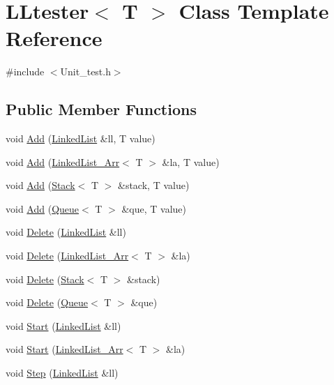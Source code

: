\hypertarget{class_l_ltester}{\section{L\-Ltester$<$ T $>$ Class Template Reference}
\label{class_l_ltester}
}


{\ttfamily \#include $<$Unit\-\_\-test.\-h$>$}

\subsection*{Public Member Functions}
\begin{DoxyCompactItemize}
\item 
void \hyperlink{class_l_ltester_af16564815500d55d820f996b9bfd73e4}{Add} (\hyperlink{class_linked_list}{Linked\-List} \&ll, T value)
\item 
void \hyperlink{class_l_ltester_ade176cb3006c4e1a3806abfa0378ecae}{Add} (\hyperlink{class_linked_list___arr}{Linked\-List\-\_\-\-Arr}$<$ T $>$ \&la, T value)
\item 
void \hyperlink{class_l_ltester_aa60fe27492ab311d316ac75c02ee95c1}{Add} (\hyperlink{class_stack}{Stack}$<$ T $>$ \&stack, T value)
\item 
void \hyperlink{class_l_ltester_af0a2eb223e399c33bb169108e838f85a}{Add} (\hyperlink{class_queue}{Queue}$<$ T $>$ \&que, T value)
\item 
void \hyperlink{class_l_ltester_a5c7cfb2fab433e1b91d49ef63fe63c97}{Delete} (\hyperlink{class_linked_list}{Linked\-List} \&ll)
\item 
void \hyperlink{class_l_ltester_ad8b9ca486cc9df214e8b1839f08eb29e}{Delete} (\hyperlink{class_linked_list___arr}{Linked\-List\-\_\-\-Arr}$<$ T $>$ \&la)
\item 
void \hyperlink{class_l_ltester_a96be238835f40dad4af79ce19f676591}{Delete} (\hyperlink{class_stack}{Stack}$<$ T $>$ \&stack)
\item 
void \hyperlink{class_l_ltester_ac88a926ffe302d4e2a4e263814adcd3e}{Delete} (\hyperlink{class_queue}{Queue}$<$ T $>$ \&que)
\item 
void \hyperlink{class_l_ltester_accd88a631a2a4fcb7d0d00f306e2b649}{Start} (\hyperlink{class_linked_list}{Linked\-List} \&ll)
\item 
void \hyperlink{class_l_ltester_a6b070aa9405668456e6aaf43986677ca}{Start} (\hyperlink{class_linked_list___arr}{Linked\-List\-\_\-\-Arr}$<$ T $>$ \&la)
\item 
void \hyperlink{class_l_ltester_a9a4fc66335b0f355ce846bddb1ea38c2}{Step} (\hyperlink{class_linked_list}{Linked\-List} \&ll)

\end{DoxyCompactItemize}
